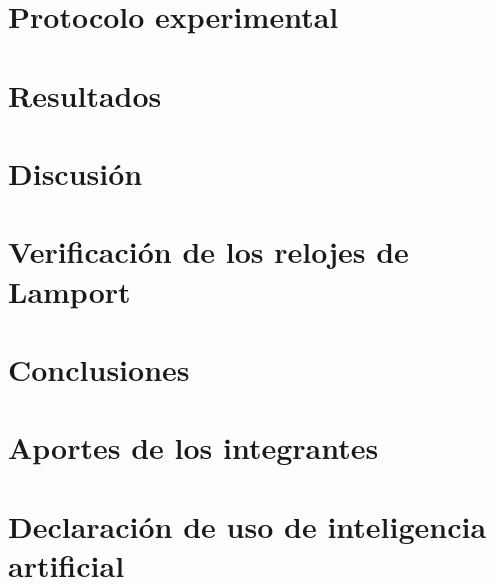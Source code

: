 \documentclass[11pt,a4paper]{article}
\begin{document}
\section{Protocolo experimental}


\section{Resultados}


\section{Discusión}




\section{Verificación de los relojes de Lamport}


\section{Conclusiones}


\section{Aportes de los integrantes}


\section{Declaración de uso de inteligencia artificial}


\printbibliography[heading=bibintoc,title={Referencias}]
\end{document}
